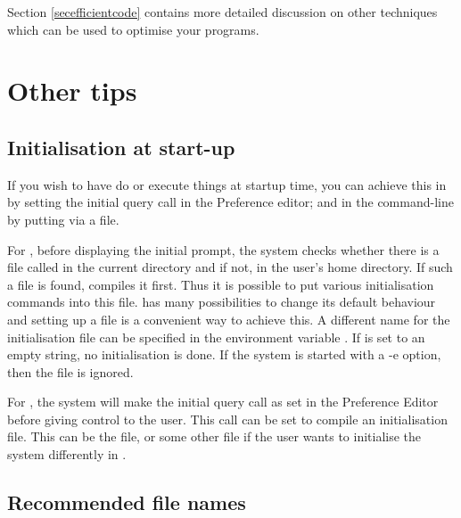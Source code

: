 Section \ref{secefficientcode} contains more detailed discussion on other
techniques which can be used to optimise your programs.


\section{Other tips}

\subsection{Initialisation at start-up}

If you wish to have {\eclipse} do or execute things at startup time, you
can achieve this in {\tkeclipse} by setting the initial query call in the
Preference editor; and in the command-line  by putting via a
 file.

For ,
before displaying the initial prompt, the system checks whether there is a file
called \label{eclipserc}
in the current directory and if not, in the user's home
directory.  If such a file is found, {\eclipse} compiles it first.
Thus it is possible to put various initialisation commands into
this file.
{\eclipse} has many possibilities to change its default behaviour and
setting up a  file is a convenient way to achieve this.
A different name for the initialisation file can be specified
in the environment variable .
If  is set to an empty string, no initialisation is done.
If the system is started with a -e option, then the  file
is ignored.

For {\tkeclipse}, the system will make the initial query call as set in the
Preference Editor before giving control to the user. This call can be set
to compile an initialisation file. This can be the  file,
or some other file if the user wants to initialise the system differently in
{\tkeclipse}.

\subsection{Recommended file names}

